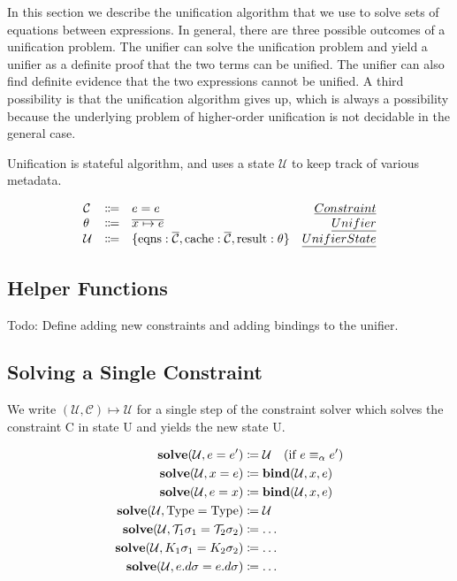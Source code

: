 In this section we describe the unification algorithm that we use to solve sets of equations between expressions.
In general, there are three possible outcomes of a unification problem.
The unifier can solve the unification problem and yield a unifier as a definite proof that the two terms can be unified.
The unifier can also find definite evidence that the two expressions cannot be unified.
A third possibility is that the unification algorithm gives up, which is always a possibility because the underlying problem of higher-order unification is not decidable in the general case.

Unification is stateful algorithm, and uses a state $\mathcal{U}$ to keep track of various metadata.

\[
\begin{array}{lclr}
    \mathcal{C} & \Coloneqq & e = e & \emph{Constraint} \\
    \mathcal{\theta} & \Coloneqq & \overline{x \mapsto e} & \emph{Unifier} \\
    \mathcal{U} & \Coloneqq & \{ \text{eqns} : \overline{\mathcal{C}}, \text{cache} :  \overline{\mathcal{C}}, \text{result} : \theta \} & \emph{Unifier State}
\end{array}
\]

\subsection{Helper Functions}
\label{subsec:unification:helper}

Todo: Define adding new constraints and adding bindings to the unifier.

\subsection{Solving a Single Constraint}
\label{subsec:unification:solve}

We write $(\mathcal{U}, \mathcal{C}) \mapsto \mathcal{U}$ for a single step of the constraint solver which solves the constraint C in state U and yields the new state U.

\begin{align*}
    \mathbf{solve}(\mathcal{U},e = e') & \coloneq \mathcal{U} \quad \text{(if $e \equiv_\alpha e'$)} \\
    \mathbf{solve}(\mathcal{U},x = e) & \coloneq \mathbf{bind}(\mathcal{U},x,e) \\
    \mathbf{solve}(\mathcal{U},e = x) & \coloneq \mathbf{bind}(\mathcal{U},x,e) \\
    \mathbf{solve}(\mathcal{U},\text{Type} = \text{Type}) & \coloneq \mathcal{U} \\
    \mathbf{solve}(\mathcal{U},\mathcal{T}_1\sigma_1 = \mathcal{T}_2 \sigma_2) & \coloneq \ldots \\
    \mathbf{solve}(\mathcal{U},K_1\sigma_1 = K_2 \sigma_2) & \coloneq \ldots \\
    \mathbf{solve}(\mathcal{U},e.d\sigma = e.d\sigma) & \coloneqq \ldots \\
\end{align*}